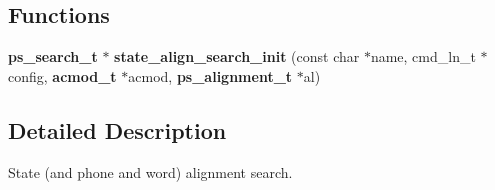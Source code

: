 \subsection*{Functions}
\begin{DoxyCompactItemize}
\item 
\mbox{\label{state__align__search_8h_a037465636cb9d40dd1ebc1e04c0fd633}} 
\textbf{ ps\+\_\+search\+\_\+t} $\ast$ {\bfseries state\+\_\+align\+\_\+search\+\_\+init} (const char $\ast$name, cmd\+\_\+ln\+\_\+t $\ast$config, \textbf{ acmod\+\_\+t} $\ast$acmod, \textbf{ ps\+\_\+alignment\+\_\+t} $\ast$al)
\end{DoxyCompactItemize}


\subsection{Detailed Description}
State (and phone and word) alignment search. 

